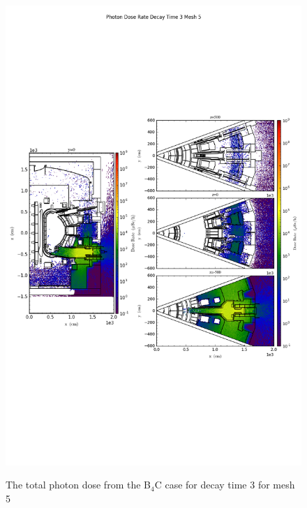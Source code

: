 \begin{figure}[ht!]
\centering
\includegraphics[trim={0cm 9cm 0cm 10cm},clip,scale=0.75]{../plots/final_model_with_b4c/Photon_Dose_Rate_Decay_Time_3_Mesh_5.png}
\label{fig:photons_dc3_no4bc_m5_flux}
\caption{The total photon dose from the B$_4$C case for decay time 3 for mesh 5}
\end{figure}
